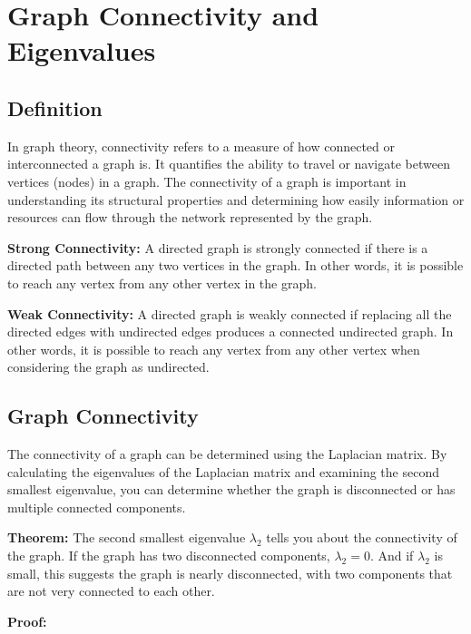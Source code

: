 \documentclass{article}
\begin{document}
\section*{Graph Connectivity and Eigenvalues}
\subsection*{Definition}
In graph theory, connectivity refers to a measure of how connected or interconnected a graph is. It quantifies the ability to travel or navigate between vertices (nodes) in a graph. The connectivity of a graph is important in understanding its structural properties and determining how easily information or resources can flow through the network represented by the graph.

\textbf{Strong Connectivity:}
A directed graph is strongly connected if there is a directed path between any two vertices in the graph. In other words, it is possible to reach any vertex from any other vertex in the graph.

\textbf{Weak Connectivity:}
A directed graph is weakly connected if replacing all the directed edges with undirected edges produces a connected undirected graph. In other words, it is possible to reach any vertex from any other vertex when considering the graph as undirected.

\subsection*{Graph Connectivity}

The connectivity of a graph can be determined using the Laplacian matrix. By calculating the eigenvalues of the Laplacian matrix and examining the second smallest eigenvalue, you can determine whether the graph is disconnected or has multiple connected components.

\textbf{Theorem:} The second smallest eigenvalue $\lambda_2$ tells you about the connectivity of the graph. If the graph has two disconnected components, $\lambda_2 = 0$. And if $\lambda_2$ is small, this suggests the graph is nearly disconnected, with two components that are not very connected to each other.

\textbf{Proof:}
\end{document}
